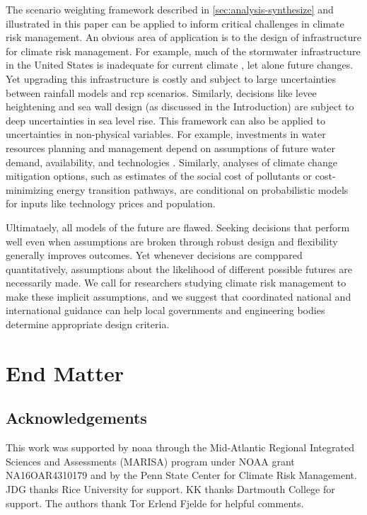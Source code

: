 \documentclass[11pt]{article}
\newcommand{\klaus}[1]{\todo[color=rosso, textcolor=grigio]{\textbf{ATTN Klaus:~}#1}}
\begin{document}
The scenario weighting framework described in \cref{sec:analysis-synthesize} and illustrated in this paper can be applied to inform critical challenges in climate risk management.
An obvious area of application is to the design of infrastructure for climate risk management.
For example, much of the stormwater infrastructure in the United States is inadequate for current climate \citep{lopez-cantu:2018}, let alone future changes.
Yet upgrading this infrastructure is costly and subject to large uncertainties between rainfall models \citep{sharma_rcp:2021} and \gls{rcp} scenarios.
Similarly, decisions like  levee heightening \citep{garner_slrise:2018,oddo_coastal:2017,vandantzig_dike:1956} and sea wall design (as discussed in the Introduction) are subject to deep uncertainties in sea level rise.
This framework can also be applied to uncertainties in non-physical variables.
For example, investments in water resources planning and management depend on assumptions of future water demand, availability, and technologies \citep{trindade_deeplyuncertainpathways:2019}.
Similarly, analyses of climate change mitigation options, such as estimates of the social cost of pollutants \citep{errickson_methane:2021} or cost-minimizing energy transition pathways, are conditional on probabilistic models for inputs like technology prices and population.

Ultimataely, all models of the future are flawed.
Seeking decisions that perform well even when assumptions are broken through robust design and flexibility generally improves outcomes.
Yet whenever decisions are comppared quantitatively, assumptions about the likelihood of different possible futures are necessarily made.
We call for researchers studying climate risk management to make these implicit assumptions, and we suggest that coordinated national and international guidance can help local governments and engineering bodies determine appropriate design criteria.\klaus{OK with this?}

\section*{End Matter}

\subsection*{Acknowledgements}

This work was supported by \acrfull{noaa} through the Mid-Atlantic Regional Integrated Sciences and Assessments (MARISA) program under NOAA grant NA16OAR4310179 and by the Penn State Center for Climate Risk Management.
JDG thanks Rice University for support.
KK thanks Dartmouth College for support.
The authors thank Tor Erlend Fjelde for helpful comments.
\end{document}
